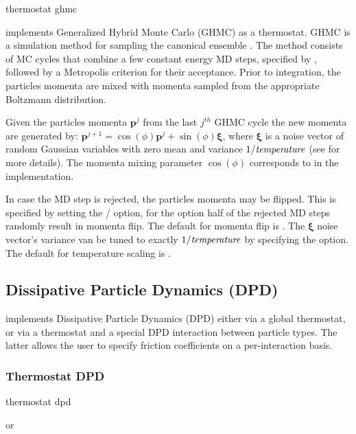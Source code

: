 \begin{essyntax}
  thermostat ghmc     
\end{essyntax}

\es implements Generalized Hybrid Monte Carlo (GHMC) as a thermostat. GHMC is a
simulation method for sampling the canonical ensemble \cite{mehlig92}. The
method consists of MC cycles that combine a few constant energy MD steps,
specified by , followed by a Metropolis criterion for their
acceptance. Prior to integration, the particles momenta are mixed with momenta
sampled from the appropriate Boltzmann distribution. 

Given the particles momenta $\mathbf{p}^j$ from the last $j^{th}$
GHMC cycle the new momenta are generated
by: $\mathbf{p}^{j+1}=\cos(\phi)\mathbf{p}^j+\sin(\phi)\pmb{\xi}$, where
$\pmb{\xi}$ is a noise vector of random Gaussian variables with zero mean
and variance $1/\var{temperature}$ (see 
\cite{horowitz91} for more details). The
momenta mixing parameter $\cos(\phi)$ corresponds to  in the
implementation.

In case the MD step is rejected, the particles momenta may be
flipped. This is specified by setting the  /
 option, for the  option half of the
rejected MD steps randomly result in momenta flip. The default for momenta
flip is . The $\pmb{\xi}$ noise vector's variance van be
tuned to exactly $1/\var{temperature}$ by specifying the 
option. The default for temperature scaling is .


\subsection{Dissipative Particle Dynamics (DPD) } \label{sec:DPD}

\es implements Dissipative Particle Dynamics (DPD) either via a global
thermostat, or via a thermostat and a special DPD interaction between
particle types.  The latter allows the user to specify friction
coefficients on a per-interaction basis.

\subsubsection{Thermostat DPD}

\begin{essyntax}
  thermostat dpd    
  \begin{features}
     or 
  \end{features}
\end{essyntax}


